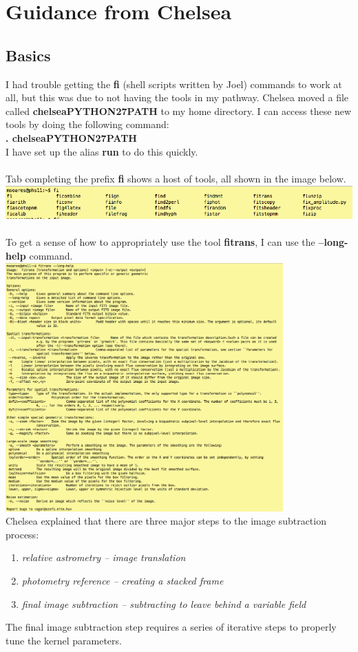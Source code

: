 \documentclass[11pt,letterpaper]{book} %
\begin{document}
\section*{Guidance from Chelsea}
\subsection*{Basics}
I had trouble getting the \textbf{fi} (shell scripts written by Joel) commands to work at all, but this was due to not having the tools in my pathway. Chelsea moved a file called \textbf{chelseaPYTHON27PATH} to my home directory. I can access these new tools by doing the following command:\\
\textbf{. chelseaPYTHON27PATH}\\ I have set up the alias \textbf{run} to do this quickly. \\ \\
Tab completing the prefix \textbf{fi} shows a host of tools, all shown in the image below.\\
\includegraphics[width=\textwidth]{fitools.png}\\ \\
To get a sense of how to appropriately use the tool \textbf{fitrans}, I can use the \textbf{--long-help} command.\\
\includegraphics[width=0.8\textwidth]{help.png}\\

Chelsea explained that there are three major steps to the image subtraction process: 
\begin{enumerate}
\item \textit{relative astrometry -- image translation}
\item \textit{photometry reference -- creating a stacked frame}
\item \textit{final image subtraction -- subtracting to leave behind a variable field}
\end{enumerate}
The final image subtraction step requires a series of iterative steps to properly tune the kernel parameters. 
\end{document}

